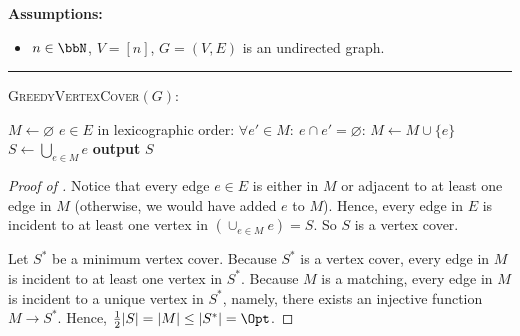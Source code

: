 \documentclass{toc}
\begin{document}
\begin{algorithmFloat}[H]
	\begin{ShadedAlgorithmBox}
		{\bfseries Assumptions:} 
		\begin{itemize}
			\item{
				$n \in \bbN$, $V = [n]$, $G = (V,E)$ is an undirected graph.
			}
		\end{itemize}
		
		\noindent\rule{\textwidth}{0.5pt}
		
		\vspace*{0.5em}
		
		\textsc{GreedyVertexCover}$(G)$:
		\begin{algorithmic}
			\vsp
			\State $M \gets \varnothing$
			\vsp
			\For $e \in E$ in lexicographic order:
				\If $\forall e' \in M: ~ e \cap e' = \varnothing$:
					\State $M \gets M \cup \{e\}$
				\EndIf
			\EndFor
			\vsp
			\State $S \gets \bigcup_{e \in M}e$
			\vsp
			\State \textbf{output} $S$
		\end{algorithmic}
	\end{ShadedAlgorithmBox}
	
	\caption{A greedy $2$-approximation algorithm for the vertex cover problem.}
	\label{algorithm:vertex-cover}
\end{algorithmFloat}


\begin{proof}[Proof of ]
	Notice that every edge $e \in E$ is either in $M$ or adjacent to at least one edge in $M$ (otherwise, we would have added $e$ to $M$). Hence, every edge in $E$ is incident to at least one vertex in $(\cup_{e \in M}e) = S$. So $S$ is a vertex cover.

	Let $S^*$ be a minimum vertex cover. Because $S^*$ is a vertex cover, every edge in $M$ is incident to at least one vertex in $S^*$. Because $M$ is a matching, every edge in $M$ is incident to a unique vertex in $S^*$, namely, there exists an injective function $M \to S^*$. Hence, $\frac{1}{2}|S| = |M| \leq |S^*| = \Opt$.
\end{proof}
\end{document}
